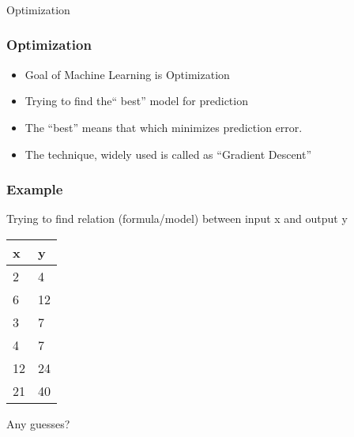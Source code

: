  \begin{frame}[fragile]\frametitle{}
\begin{center}
{\Large Optimization }
\end{center}
\end{frame}

\begin{frame}[fragile]\frametitle{Optimization}

\begin{itemize}
\item  Goal of Machine Learning is Optimization
\item Trying to find the`` best'' model for prediction
\item The ``best'' means that which minimizes prediction error.
\item The technique, widely used is called as ``Gradient Descent''
\end{itemize}
\end{frame}

\begin{frame}[fragile]\frametitle{Example}

Trying to find relation (formula/model) between input x and output y

	\begin{table}[!h]
		\centering
		\begin{tabular}{| l | l |}
			\hline
			x & y \\ \hline
			2 & 4 \\ \hline
			6 & 12 \\ \hline
			3 & 7 \\ \hline
			4 & 7 \\ \hline
			12 & 24 \\ \hline
			21 & 40 \\ \hline			
		\end{tabular}
\end{table}
Any guesses?
\end{frame}

